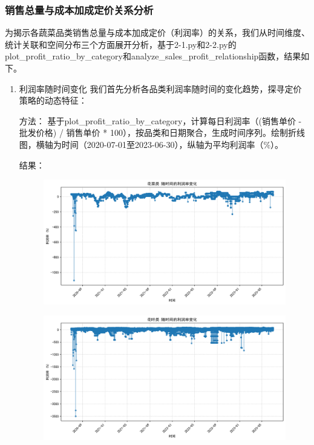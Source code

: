 \documentclass{cumcmthesis} %
\begin{document}
\subsubsection{销售总量与成本加成定价关系分析}

为揭示各蔬菜品类销售总量与成本加成定价（利润率）的关系，我们从时间维度、统计关联和空间分布三个方面展开分析，基于2-1.py和2-2.py的plot\_profit\_ratio\_by\_category和analyze\_sales\_profit\_relationship函数，结果如下。


\begin{enumerate}
\item 利润率随时间变化
    我们首先分析各品类利润率随时间的变化趋势，探寻定价策略的动态特征：
    
        方法：
        基于plot\_profit\_ratio\_by\_category，计算每日利润率（(销售单价 - 批发价格) / 销售单价 * 100），按品类和日期聚合，生成时间序列。绘制折线图，横轴为时间（2020-07-01至2023-06-30），纵轴为平均利润率（\%）。
    

        结果：
        \begin{figure}[H]
            \centering
            \begin{minipage}[c]{0.45\textwidth}
                \centering
                \includegraphics[width=\textwidth]{fig/花菜_profit_ratio_over_time.png}
                \label{fig:sample-figure-a}
            \end{minipage}
            \begin{minipage}[c]{0.45\textwidth}
                \centering
                \includegraphics[width=\textwidth]{fig/花叶_profit_ratio_over_time.png}
                \label{fig:sample-figure-b}
            \end{minipage}
            \vspace{1em} %



\end{figure}
\end{enumerate}
\end{document}
